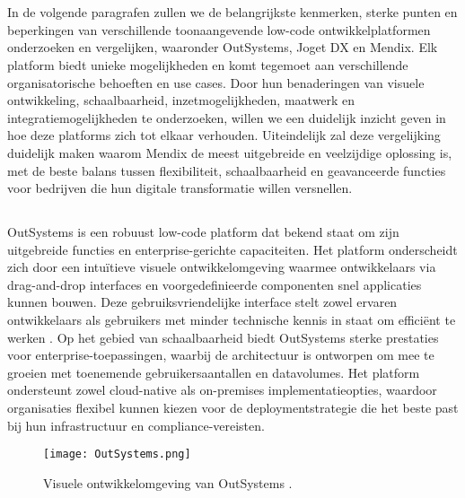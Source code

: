 \section{}%
In de volgende paragrafen zullen we de belangrijkste kenmerken, sterke punten en beperkingen van verschillende toonaangevende low-code ontwikkelplatformen onderzoeken en vergelijken, waaronder OutSystems, Joget DX en Mendix. Elk platform biedt unieke mogelijkheden en komt tegemoet aan verschillende organisatorische behoeften en use cases. Door hun benaderingen van visuele ontwikkeling, schaalbaarheid, inzetmogelijkheden, maatwerk en integratiemogelijkheden te onderzoeken, willen we een duidelijk inzicht geven in hoe deze platforms zich tot elkaar verhouden. Uiteindelijk zal deze vergelijking duidelijk maken waarom Mendix de meest uitgebreide en veelzijdige oplossing is, met de beste balans tussen flexibiliteit, schaalbaarheid en geavanceerde functies voor bedrijven die hun digitale transformatie willen versnellen.
\subsection{}
OutSystems is een robuust low-code platform dat bekend staat om zijn uitgebreide functies en enterprise-gerichte capaciteiten. Het platform onderscheidt zich door een intuïtieve visuele ontwikkelomgeving waarmee ontwikkelaars via drag-and-drop interfaces en voorgedefinieerde componenten snel applicaties kunnen bouwen. Deze gebruiksvriendelijke interface stelt zowel ervaren ontwikkelaars als gebruikers met minder technische kennis in staat om efficiënt te werken \autocite{Sido2024}. Op het gebied van schaalbaarheid biedt OutSystems sterke prestaties voor enterprise-toepassingen, waarbij de architectuur is ontworpen om mee te groeien met toenemende gebruikersaantallen en datavolumes. Het platform ondersteunt zowel cloud-native als on-premises implementatieopties, waardoor organisaties flexibel kunnen kiezen voor de deploymentstrategie die het beste past bij hun infrastructuur en compliance-vereisten. 

\begin{figure}[H]
    \centering
    \texttt{[image: OutSystems.png]}
    \caption[Visuele ontwikkelomgeving Outsystems]{\label{fig:outsystems} Visuele ontwikkelomgeving van OutSystems \autocite{FigueiraPutresza2021}.}
\end{figure}


